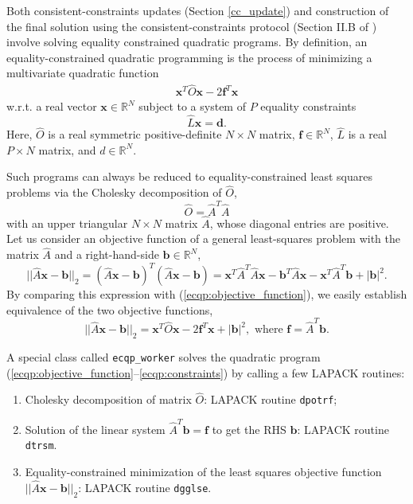\documentclass[]{article}
\begin{document}
Both consistent-constraints updates (Section \ref{cc_update}) and  construction of the final solution using the consistent-constraints protocol (Section II.B of \cite{socc_paper}) involve solving equality constrained quadratic programs. By definition, an equality-constrained quadratic programming is the process of minimizing a multivariate quadratic function
\begin{eqnarray}\label{ecqp:objective_function}
    \mathbf{x}^T \hat O \mathbf{x} - 2\mathbf{f}^T\mathbf{x}
\end{eqnarray}
w.r.t. a real vector $\mathbf{x}\in\mathbb{R}^N$ subject to a system of $P$ equality constraints
\begin{equation}\label{ecqp:constraints}
    \hat L \mathbf{x} = \mathbf{d}.
\end{equation}
Here, $\hat O$ is a real symmetric positive-definite $N\times N$ matrix, $\mathbf{f}\in\mathbb{R}^N$, $\hat L$ is a real $P \times N$ matrix, and $d \in \mathbb{R}^N$.

Such programs can always be reduced to equality-constrained least squares problems via the Cholesky decomposition of $\hat O$,
\begin{equation}
    \hat O = \hat A^T \hat A
\end{equation}
with an upper triangular $N\times N$ matrix $\hat A$, whose diagonal entries are positive. Let us consider an objective function of a general least-squares problem with the matrix $\hat A$ and a right-hand-side $\mathbf{b}\in \mathbb{R}^N$,
\begin{equation}
    ||\hat A\mathbf{x} - \mathbf{b}||_2 =
    (\hat A\mathbf{x} - \mathbf{b})^T (\hat A\mathbf{x} - \mathbf{b}) =
    \mathbf{x}^T \hat A^T \hat A \mathbf{x} -
    \mathbf{b}^T \hat A\mathbf{x} - \mathbf{x}^T \hat A^T\mathbf{b}
    + |\mathbf{b}|^2.
\end{equation}
By comparing this expression with (\ref{ecqp:objective_function}), we easily establish equivalence of the two objective functions,
\begin{equation}
    ||\hat A\mathbf{x} - \mathbf{b}||_2 =
    \mathbf{x}^T \hat O \mathbf{x} - 2\mathbf{f}^T\mathbf{x} + |\mathbf{b}|^2,
    \textrm{ where } \mathbf{f} = \hat A^T\mathbf{b}.
\end{equation}

A special class called \verb|ecqp_worker| solves the quadratic program
(\ref{ecqp:objective_function}--\ref{ecqp:constraints}) by calling a few LAPACK routines:
\begin{enumerate}
    \item Cholesky decomposition of matrix $\hat O$: LAPACK routine \verb|dpotrf|;

    \item Solution of the linear system $\hat A^T\mathbf{b} = \mathbf{f}$ to get the RHS $\mathbf{b}$: LAPACK routine \verb|dtrsm|.

    \item Equality-constrained minimization of the least squares objective function $||\hat A\mathbf{x} - \mathbf{b}||_2$: LAPACK routine \verb|dgglse|.
\end{enumerate}
\end{document}
